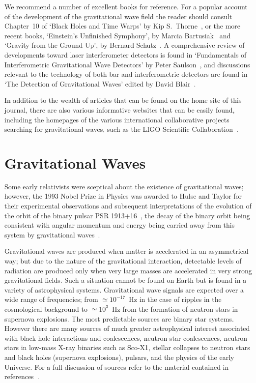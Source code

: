 \documentclass{article}
\begin{document}
We recommend a number of excellent books for reference. For a popular account of
the development of the gravitational wave field the reader should consult
Chapter~10 of `Black Holes and Time Warps' by Kip S.\ Thorne~\cite{Thorne}, or
the more recent books, `Einstein's Unfinished Symphony', by Marcia
Bartusiak~\cite{Bartusiak:2003} and `Gravity from the Ground Up', by Bernard
Schutz~\cite{Schutz:2003}. A comprehensive review of developments toward laser
interferometer detectors is found in `Fundamentals of Interferometric
Gravitational Wave Detectors' by Peter Saulson~\cite{Saulsonbook}, and
discussions relevant to the technology of both bar and interferometric detectors
are found in `The Detection of Gravitational Waves' edited by David
Blair~\cite{Blair}.

In addition to the wealth of articles that can be found on the home site of
this journal, there are also various informative websites that can be easily
found, including the homepages of the various international collaborative
projects searching for gravitational waves, such as the LIGO Scientific
Collaboration~\cite{LSCweb}.

\newpage


\section{Gravitational Waves}
\label{section:gravwaves}

Some early relativists were sceptical about the existence of gravitational
waves; however, the 1993 Nobel Prize in Physics was awarded to Hulse and Taylor
for their experimental observations and subsequent interpretations of the
evolution of the orbit of the binary pulsar PSR 1913+16~\cite{Hulse, Taylor},
the decay of the binary orbit being consistent with angular momentum and energy
being carried away from this system by gravitational waves~\cite{Will}.

Gravitational waves are produced when matter is accelerated in an asymmetrical
way; but due to the nature of the gravitational interaction, detectable levels
of radiation are produced only when very large masses are accelerated in very
strong gravitational fields. Such a situation cannot be found on Earth but is
found in a variety of astrophysical systems. Gravitational wave signals are
expected over a wide range of frequencies; from $\simeq 10^{-17}$~Hz in the case
of ripples in the cosmological background to $\simeq 10^3$~Hz from the formation
of neutron stars in supernova explosions. The most predictable sources are
binary star systems. However there are many sources of much greater
astrophysical interest associated with black hole interactions and coalescences,
neutron star coalescences, neutron stars in low-mass X-ray binaries such as
Sco-X1, stellar collapses to neutron stars and black holes (supernova
explosions), pulsars, and the physics of the early Universe. For a full
discussion of sources refer to the material contained in
references~\cite{Sathyaprakash:2009,LISAsymposium, sources, Amaldiproc}.
\end{document}
